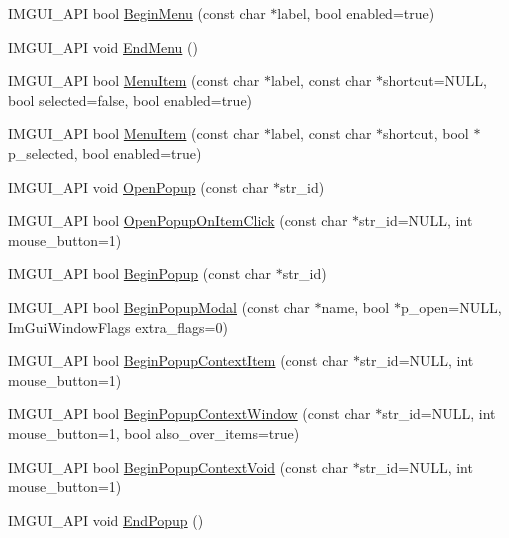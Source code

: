 \begin{DoxyCompactItemize}
\item 
I\+M\+G\+U\+I\+\_\+\+A\+PI bool \hyperlink{namespace_im_gui_a1e55711a21f97d5dff919d697d3a7201}{Begin\+Menu} (const char $\ast$label, bool enabled=true)
\item 
I\+M\+G\+U\+I\+\_\+\+A\+PI void \hyperlink{namespace_im_gui_a1448a5a4e8c431c15f991e9255c0df95}{End\+Menu} ()
\item 
I\+M\+G\+U\+I\+\_\+\+A\+PI bool \hyperlink{namespace_im_gui_aa1bae511ca47478998693a9d8c84f2e6}{Menu\+Item} (const char $\ast$label, const char $\ast$shortcut=N\+U\+LL, bool selected=false, bool enabled=true)
\item 
I\+M\+G\+U\+I\+\_\+\+A\+PI bool \hyperlink{namespace_im_gui_a237e76bff3088f1c2622f4aebae2356e}{Menu\+Item} (const char $\ast$label, const char $\ast$shortcut, bool $\ast$p\+\_\+selected, bool enabled=true)
\item 
I\+M\+G\+U\+I\+\_\+\+A\+PI void \hyperlink{namespace_im_gui_a9576648c40b92f54b671e2e51654dd2c}{Open\+Popup} (const char $\ast$str\+\_\+id)
\item 
I\+M\+G\+U\+I\+\_\+\+A\+PI bool \hyperlink{namespace_im_gui_a546fc46d8f510cb17a2f272891e2f5b3}{Open\+Popup\+On\+Item\+Click} (const char $\ast$str\+\_\+id=N\+U\+LL, int mouse\+\_\+button=1)
\item 
I\+M\+G\+U\+I\+\_\+\+A\+PI bool \hyperlink{namespace_im_gui_ab71527de4b52ff970e5396040302e134}{Begin\+Popup} (const char $\ast$str\+\_\+id)
\item 
I\+M\+G\+U\+I\+\_\+\+A\+PI bool \hyperlink{namespace_im_gui_aa70aaf1dacf5702f85feca6f729a307a}{Begin\+Popup\+Modal} (const char $\ast$name, bool $\ast$p\+\_\+open=N\+U\+LL, Im\+Gui\+Window\+Flags extra\+\_\+flags=0)
\item 
I\+M\+G\+U\+I\+\_\+\+A\+PI bool \hyperlink{namespace_im_gui_a579fc507f5b5d164c8fd628aee3d7bbd}{Begin\+Popup\+Context\+Item} (const char $\ast$str\+\_\+id=N\+U\+LL, int mouse\+\_\+button=1)
\item 
I\+M\+G\+U\+I\+\_\+\+A\+PI bool \hyperlink{namespace_im_gui_acf98c99f041ea341d0328e071c56411b}{Begin\+Popup\+Context\+Window} (const char $\ast$str\+\_\+id=N\+U\+LL, int mouse\+\_\+button=1, bool also\+\_\+over\+\_\+items=true)
\item 
I\+M\+G\+U\+I\+\_\+\+A\+PI bool \hyperlink{namespace_im_gui_a87a2228929503fff067d2e167a690751}{Begin\+Popup\+Context\+Void} (const char $\ast$str\+\_\+id=N\+U\+LL, int mouse\+\_\+button=1)
\item 
I\+M\+G\+U\+I\+\_\+\+A\+PI void \hyperlink{namespace_im_gui_aa6a9b5696f2ea7eed7683425fc77b8f2}{End\+Popup} ()

\end{DoxyCompactItemize}
